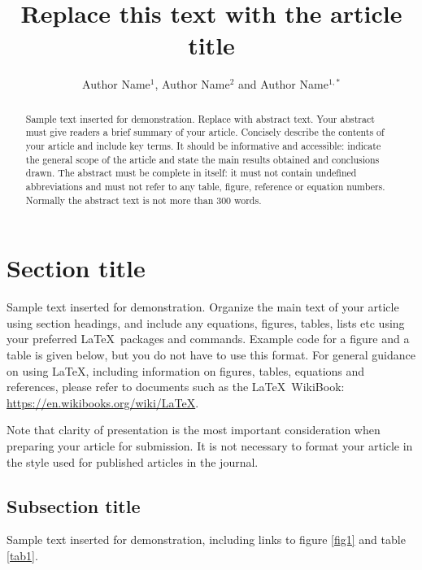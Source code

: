 \documentclass{iopjournal}
\begin{document}

\title{Replace this text with the article title}

\author{Author Name$^1$, Author Name$^2$ and Author Name$^{1,*}$}






\begin{abstract}
Sample text inserted for demonstration. Replace with abstract text. Your abstract must give readers a brief summary of your article. Concisely describe the contents of your article and include key terms. It should be informative and accessible: indicate the general scope of the article and state the main results obtained and conclusions drawn. The abstract must be complete in itself: it must not contain undefined abbreviations and must not refer to any table, figure, reference or equation numbers. Normally the abstract text is not more than 300 words.
\end{abstract}

\section{Section title}
Sample text inserted for demonstration. Organize the main text of your article using section headings, and include any equations, figures, tables, lists etc using your preferred \LaTeX\ packages and commands. Example code for a figure and a table is given below, but you do not have to use this format. For general guidance on using \LaTeX , including information on figures, tables, equations and references, please refer to documents such as the \LaTeX\ WikiBook: \href{https://en.wikibooks.org/wiki/LaTeX}{https://en.wikibooks.org/wiki/LaTeX}.

Note that clarity of presentation is the most important consideration when preparing your article for submission. It is not necessary to format your article in the style used for published articles in the journal.

\subsection{Subsection title}
Sample text inserted for demonstration, including links to figure \ref{fig1} and table \ref{tab1}.
\end{document}
